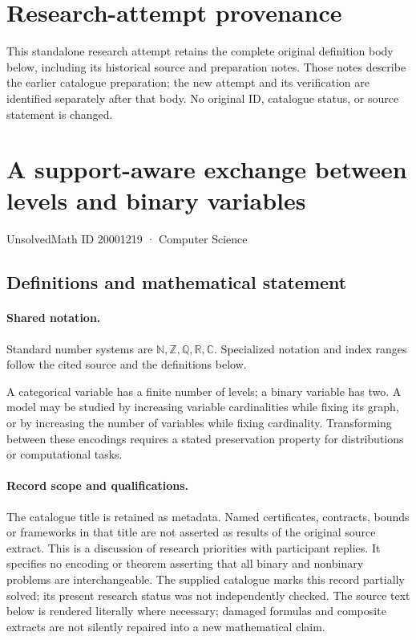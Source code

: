 \documentclass[11pt]{article}
\begin{document}
\section*{Research-attempt provenance}
This standalone research attempt retains the complete original definition body below,
including its historical source and preparation notes. Those notes describe the
earlier catalogue preparation; the new attempt and its verification are identified
separately after that body. No original ID, catalogue status, or source statement is changed.

\section{A support-aware exchange between levels and binary variables}\label{20001219}
{\small UnsolvedMath ID 20001219 · Computer Science}
\subsection{Definitions and mathematical statement}

\paragraph{Shared notation.}Standard number systems are $\mathbb N,\mathbb Z,\mathbb Q,\mathbb R,\mathbb C$. Specialized notation and index ranges follow the cited source and the definitions below.


A categorical variable has a finite number of levels; a binary variable has two. A model may be studied by increasing variable cardinalities while fixing its graph, or by increasing the number of variables while fixing cardinality. Transforming between these encodings requires a stated preservation property for distributions or computational tasks.
\paragraph{Record scope and qualifications.}
The catalogue title is retained as metadata. Named certificates, contracts, bounds or frameworks in that title are not asserted as results of the original source extract.
This is a discussion of research priorities with participant replies. It specifies no encoding or theorem asserting that all binary and nonbinary problems are interchangeable. The supplied catalogue marks this record partially solved; its present research status was not independently checked.
The source text below is rendered literally where necessary; damaged formulas and composite extracts are not silently repaired into a new mathematical claim.
\end{document}
